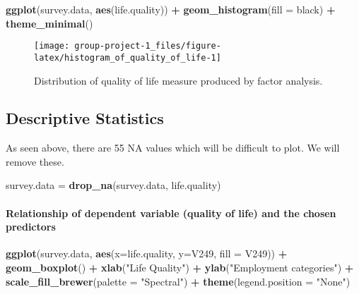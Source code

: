 \documentclass[
]{article}
\newenvironment{Shaded}{\begin{snugshade}}{\end{snugshade}}
\newcommand{\AttributeTok}[1]{\textcolor[rgb]{0.13,0.29,0.53}{#1}}
\newcommand{\FunctionTok}[1]{\textcolor[rgb]{0.13,0.29,0.53}{\textbf{#1}}}
\newcommand{\NormalTok}[1]{#1}
\newcommand{\OtherTok}[1]{\textcolor[rgb]{0.56,0.35,0.01}{#1}}
\newcommand{\SpecialCharTok}[1]{\textcolor[rgb]{0.81,0.36,0.00}{\textbf{#1}}}
\newcommand{\StringTok}[1]{\textcolor[rgb]{0.31,0.60,0.02}{#1}}
\begin{document}
\begin{Shaded}
\begin{Highlighting}[]
\FunctionTok{ggplot}\NormalTok{(survey.data, }\FunctionTok{aes}\NormalTok{(life.quality)) }\SpecialCharTok{+} 
  \FunctionTok{geom\_histogram}\NormalTok{(}\AttributeTok{fill =} \StringTok{\textquotesingle{}black\textquotesingle{}}\NormalTok{) }\SpecialCharTok{+} 
  \FunctionTok{theme\_minimal}\NormalTok{()}
\end{Highlighting}
\end{Shaded}

\begin{figure}

{\centering \texttt{[image: group-project-1\_files/figure-latex/histogram\_of\_quality\_of\_life-1]} 

}

\caption{Distribution of quality of life measure produced by factor analysis.}\label{fig:histogram_of_quality_of_life}
\end{figure}

\hypertarget{descriptive-statistics}{%
\subsection{Descriptive Statistics}\label{descriptive-statistics}}

As seen above, there are 55 NA values which will be difficult to plot.
We will remove these.

\begin{Shaded}
\begin{Highlighting}[]
\NormalTok{survey.data }\OtherTok{=} \FunctionTok{drop\_na}\NormalTok{(survey.data, life.quality)}
\end{Highlighting}
\end{Shaded}

\hypertarget{relationship-of-dependent-variable-quality-of-life-and-the-chosen-predictors}{%
\paragraph{Relationship of dependent variable (quality of life) and the
chosen
predictors}\label{relationship-of-dependent-variable-quality-of-life-and-the-chosen-predictors}}

\begin{Shaded}
\begin{Highlighting}[]
\FunctionTok{ggplot}\NormalTok{(survey.data, }\FunctionTok{aes}\NormalTok{(}\AttributeTok{x=}\NormalTok{life.quality, }\AttributeTok{y=}\NormalTok{V249, }\AttributeTok{fill =}\NormalTok{ V249)) }\SpecialCharTok{+} 
  \FunctionTok{geom\_boxplot}\NormalTok{() }\SpecialCharTok{+}
  \FunctionTok{xlab}\NormalTok{(}\StringTok{"Life Quality"}\NormalTok{) }\SpecialCharTok{+}
  \FunctionTok{ylab}\NormalTok{(}\StringTok{"Employment categories"}\NormalTok{) }\SpecialCharTok{+}
  \FunctionTok{scale\_fill\_brewer}\NormalTok{(}\AttributeTok{palette =} \StringTok{"Spectral"}\NormalTok{) }\SpecialCharTok{+}
  \FunctionTok{theme}\NormalTok{(}\AttributeTok{legend.position =} \StringTok{"None"}\NormalTok{)}
\end{Highlighting}
\end{Shaded}
\end{document}
